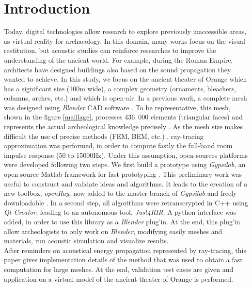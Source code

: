 \documentclass[AMA,STIX1COL]{WileyNJD-v2}
\begin{document}
\section*{Introduction}
\label{sec1}
Today, digital technologies allow research to explore previously inaccessible areas, as virtual reality for archaeology. In this domain, many works focus on the visual restitution, but acoustic studies can reinforce researches to improve the understanding of the ancient world. For example, during the Roman Empire, architects have designed buildings also based on the sound propagation they wanted to achieve\cite{vitruve}. In this study, we focus on the ancient theater of Orange which has a significant size (100m wide), a complex geometry (ornaments, bleachers, columns, arches, etc.) and which is open-air. In a previous work, a complete mesh was designed using \textit{Blender} CAD software \cite{doc_blender}. To be representative, this mesh, shown in the figure \ref{maillage}, processes 436~000 elements (triangular faces) and represents the actual archeological knowledge precisely \cite{theseRobin}. As the mesh size makes difficult the use of precise methods (FEM, BEM, etc.) \cite{gypsilab}, ray-tracing approximation was performed, in order to compute fastly the full-band room impulse response (50 to 15000Hz). Under this assumption, open-sources platforms were developed following two steps. We first build a prototype using \textit{Gypsilab}, an open source {\sc Matlab} framework for fast prototyping \cite{gypsilab}. This preliminary work was useful to construct and validate ideas and algorithms. It leads to the creation of a new toolbox, \textit{openRay}, now added to the master branch of \textit{Gypsilab} and freely downloadable \cite{githubGypsi}. In a second step, all algorithms were retranscrypted in C++ using \textit{Qt Creator}, leading to an autonomous tool, \textit{Just4RIR}. A python interface was added, in order to use this library as a \textit{Blender} plug'in. At the end, this plug'in allow archeologists to only work on \textit{Blender}, modifying easily meshes and materials, run acoustic simulation and visualize results. \\
After reminders on acoustical energy propagation represented by ray-tracing, this paper gives implementation details of the method that was used to obtain a fast computation for large meshes. At the end, validation test cases are given and application on a virtual model of the ancient theater of Orange is performed. 
\end{document}
